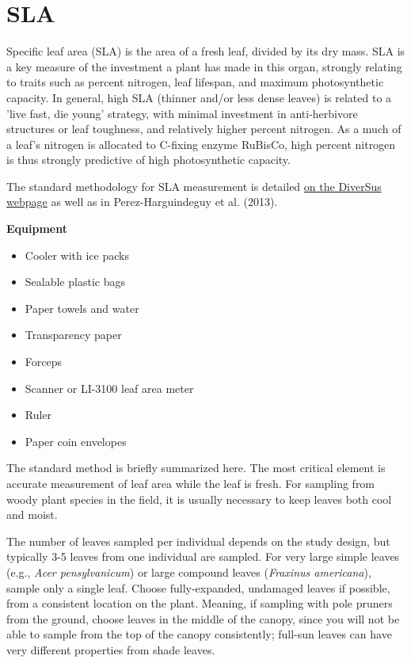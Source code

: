 \documentclass[11pt]{article}
\begin{document}
\renewcommand{\familydefault}{\sfdefault}
\sffamily
\setlength{\parskip}{2 mm}
\flushleft

\section*{SLA}

Specific leaf area (SLA) is the area of a fresh leaf, divided by its dry mass. SLA is a key measure of the investment a plant has made in this organ, strongly relating to traits such as percent nitrogen, leaf lifespan, and maximum photosynthetic capacity. In general, high SLA (thinner and/or less dense leaves) is related to a 'live fast, die young' strategy, with minimal investment in anti-herbivore structures or leaf toughness, and relatively higher percent nitrogen. As a much of a leaf's nitrogen is allocated to C-fixing enzyme RuBisCo, high percent nitrogen is thus strongly predictive of high photosynthetic capacity.


The standard methodology for SLA measurement is detailed \href{http://www.nucleodiversus.org/index.php?mod=caracter&id=17}{on the DiverSus webpage} as well as in Perez-Harguindeguy et al. (2013). 



\textbf{Equipment}
\begin{itemize}
\item{Cooler with ice packs}
\item{Sealable plastic bags}
\item{Paper towels and water}
\item{Transparency paper}
\item{Forceps}
\item{Scanner or LI-3100 leaf area meter}
\item{Ruler}
\item{Paper coin envelopes}
\end{itemize}

The standard method is briefly summarized here. The most critical element is accurate measurement of leaf area while the leaf is fresh. For sampling from woody plant species in the field, it is usually necessary to keep leaves both cool and moist. 

The number of leaves sampled per individual depends on the study design, but typically 3-5 leaves from one individual are sampled. For very large simple leaves (e.g., \textit{Acer pensylvanicum}) or large compound leaves (\textit{Fraxinus americana}), sample only a single leaf. Choose fully-expanded, undamaged leaves if possible, from a consistent location on the plant. Meaning, if sampling with pole pruners from the ground, choose leaves in the middle of the canopy, since you will not be able to sample from the top of the canopy consistently; full-sun leaves can have very different properties from shade leaves.
\end{document}
